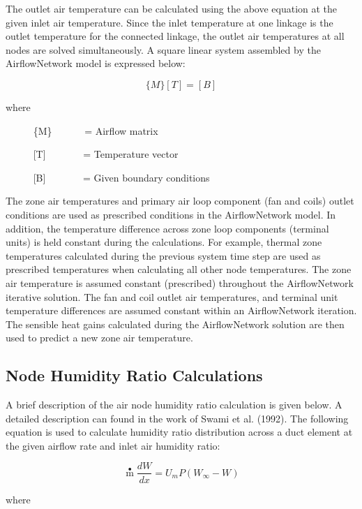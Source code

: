 The outlet air temperature can be calculated using the above equation at the given inlet air temperature. Since the inlet temperature at one linkage is the outlet temperature for the connected linkage, the outlet air temperatures at all nodes are solved simultaneously. A square linear system assembled by the AirflowNetwork model is expressed below:

\begin{equation}
\{ M\} [T] = [B]
\end{equation}

where

~~~~~ \{M\}~~~~~~ = Airflow matrix

~~~~~ {[}T{]}~~~~~~~ = Temperature vector

~~~~~ {[}B{]}~~~~~~~ = Given boundary conditions

The zone air temperatures and primary air loop component (fan and coils) outlet conditions are used as prescribed conditions in the AirflowNetwork model. In addition, the temperature difference across zone loop components (terminal units) is held constant during the calculations. For example, thermal zone temperatures calculated during the previous system time step are used as prescribed temperatures when calculating all other node temperatures. The zone air temperature is assumed constant (prescribed) throughout the AirflowNetwork iterative solution. The fan and coil outlet air temperatures, and terminal unit temperature differences are assumed constant within an AirflowNetwork iteration. The sensible heat gains calculated during the AirflowNetwork solution are then used to predict a new zone air temperature.

\subsection{Node Humidity Ratio Calculations}\label{node-humidity-ratio-calculations}

A brief description of the air node humidity ratio calculation is given below. A detailed description can found in the work of Swami et al. (1992). The following equation is used to calculate humidity ratio distribution across a duct element at the given airflow rate and inlet air humidity ratio:

\begin{equation}
\mathop m\limits^ \bullet  \frac{{dW}}{{dx}} = {U_m}P(W{}_\infty  - W)
\end{equation}

where


